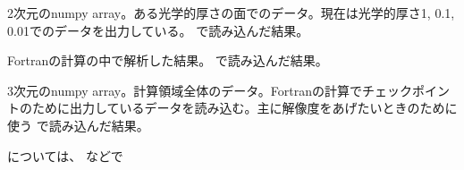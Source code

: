 \documentclass[letterpaper,10pt,dvipdfmx,report]{sphinxmanual}
\begin{document}

\begin{fulllineitems}
\label{\detokenize{io:R2D2.R2D2_data.qt}}
2次元のnumpy array。ある光学的厚さの面でのデータ。現在は光学的厚さ1, 0.1, 0.01でのデータを出力している。 {\hyperref[\detokenize{io:R2D2.R2D2_data.read_qq_tau}]{}} で読み込んだ結果。

\end{fulllineitems}


\begin{fulllineitems}
\label{\detokenize{io:R2D2.R2D2_data.vc}}
Fortranの計算の中で解析した結果。 {\hyperref[\detokenize{io:R2D2.R2D2_data.read_vc}]{}} で読み込んだ結果。

\end{fulllineitems}


\begin{fulllineitems}
\label{\detokenize{io:R2D2.R2D2_data.qc}}
3次元のnumpy array。計算領域全体のデータ。Fortranの計算でチェックポイントのために出力しているデータを読み込む。主に解像度をあげたいときのために使う {\hyperref[\detokenize{io:R2D2.R2D2_data.read_qq_check}]{}} で読み込んだ結果。

\end{fulllineitems}


{\hyperref[\detokenize{io:R2D2.R2D2_data.p}]{}} については、 などで

\begin{sphinxVerbatim}[commandchars=\\\{\}]
 
  
   
       \PYG{l+s+s1}{R2D2.p[}\PYG{l+s+s1}{]}
\end{sphinxVerbatim}
\end{document}
